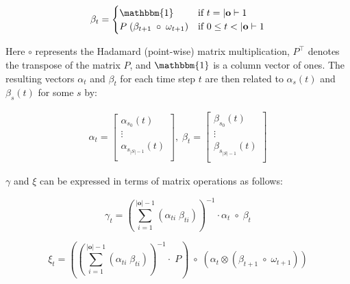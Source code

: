 \begin{equation}
    \label{eq:beta}
    {\beta}_t =
    \begin{cases}
        \mathbbm{1} & \text{if } t = |\mathbf{o}|-1        \\
        {P} \; ({\beta}_{t + 1} \; \circ \; {\omega}_{t + 1}) & \text{if } 0 \leq t < |\mathbf{o}|-1 \\
    \end{cases}
\end{equation}

Here $\circ$ represents the Hadamard (point-wise) matrix multiplication, ${P}^\top$ denotes the transpose of the matrix ${P}$, and $\mathbbm{1}$ is a column vector of ones.
The resulting vectors ${\alpha}_t$ and ${\beta}_t$ for each time step $t$ are then related to $\alpha_s(t)$ and $\beta_s(t)$ for some $s$ by:

\begin{align}
    {\alpha}_t = \begin{bmatrix}
                                \alpha_{s_0}(t)       \\
                                \vdots                \\
                                \alpha_{s_{|S|-1}}(t) \\
    \end{bmatrix}, \;
    {\beta}_t = \begin{bmatrix}
                               \beta_{s_0}(t)       \\
                               \vdots               \\
                               \beta_{s_{|S|-1}}(t) \\
    \end{bmatrix}
\end{align}

$\gamma$ and $\xi$ can be expressed in terms of matrix operations as follows:

\begin{equation}
    {\gamma}_t = (\sum_{i=1}^{|\mathbf{o}|-1} (\alpha_{t i} \;\beta_{t i}))^{-1} \cdot \alpha_t \; \circ \; \beta_t
    \label{eq:gamma-matrix}
\end{equation}

\begin{equation}
    {\xi}_t = ((\sum_{i=1}^{|\mathbf{o}|-1} (\alpha_{t i} \; \beta_{t i}))^{-1} \cdot \; {P}) \; \circ \;(\alpha_t \otimes (\beta_{t+1} \; \circ \; {\omega}_{t+1}))
    \label{eq:xi-matrix}
\end{equation}

